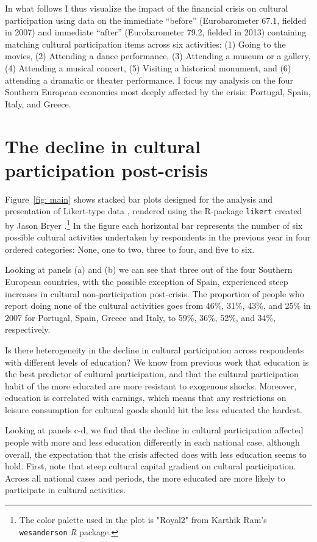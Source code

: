 \documentclass{article}
\begin{document}
In what follows I thus visualize the impact of the financial crisis on cultural participation using data on the immediate ``before'' (Eurobarometer 67.1, fielded in 2007) and immediate ``after'' (Eurobarometer 79.2, fielded in 2013) containing matching cultural participation items across six activities: (1) Going to the movies, (2) Attending a dance performance, (3) Attending a museum or a gallery, (4) Attending a musical concert, (5) Visiting a historical monument, and (6) attending a dramatic or theater performance. I focus my analysis on the four Southern European economies most deeply affected by the crisis: Portugal, Spain, Italy, and Greece. 

\section{The decline in cultural participation post-crisis}
Figure~\ref{fig: main} shows stacked bar plots designed for the analysis and presentation of Likert-type data \citep{heiberger2014design}, rendered using the {\em} R-package \texttt{likert} created by Jason Bryer \citeyearpar{bryer-likert}.\footnote{The color palette used in the plot is "Royal2" from Karthik Ram's \citeyearpar{Ram_wespalette} \texttt{wesanderson} {\em R} package.} In the figure each horizontal bar represents the number of six possible cultural activities undertaken by respondents in the previous year in four ordered categories: None, one to two, three to four, and five to six. 

Looking at panels (a) and (b) we can see that three out of the four Southern European countries, with the possible exception of Spain, experienced steep increases in cultural non-participation post-crisis. The proportion of people who report doing none of the cultural activities goes from 46\%, 31\%, 43\%, and 25\% in 2007 for Portugal, Spain, Greece and Italy, to 59\%, 36\%, 52\%, and 34\%, respectively. 

Is there heterogeneity in the decline in cultural participation across respondents with different levels of education? We know from previous work that education is the best predictor of cultural participation, and that the cultural participation habit of the more educated are more resistant to exogenous shocks. Moreover, education is correlated with earnings, which means that any restrictions on leisure consumption for cultural goods should hit the less educated the hardest. 

Looking at panels c-d, we find that the decline in cultural participation affected people with more and less education differently in each national case, although overall, the expectation that the crisis affected does with less education seems to hold. First, note that steep cultural capital gradient on cultural participation. Across all national cases and periods, the more educated are more likely to participate in cultural activities.  
\end{document}
